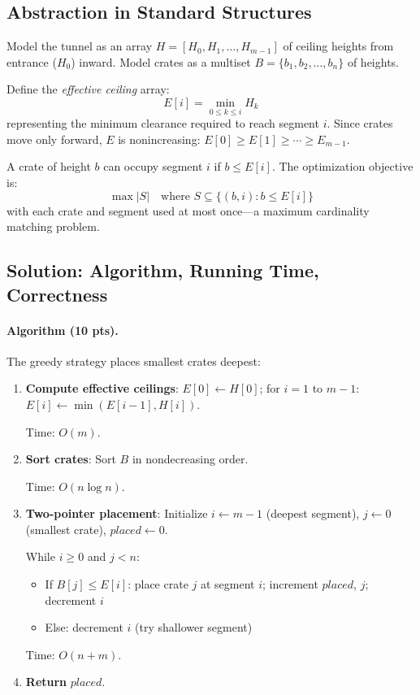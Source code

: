 \documentclass[sigconf]{acmart}
\begin{document}
\subsection{Abstraction in Standard Structures}
\label{subsec:abstraction-greedy}

Model the tunnel as an array $H = [H_0, H_1, \ldots, H_{m-1}]$ of ceiling heights from entrance ($H_0$) inward. Model crates as a multiset $B = \{b_1, b_2, \ldots, b_n\}$ of heights.

Define the \emph{effective ceiling} array:
\[
E[i] = \min_{0 \leq k \leq i} H_k
\]
representing the minimum clearance required to reach segment $i$. Since crates move only forward, $E$ is nonincreasing: $E[0] \geq E[1] \geq \cdots \geq E_{m-1}$.

A crate of height $b$ can occupy segment $i$ if $b \leq E[i]$. The optimization objective is:
\[
\max |S| \quad \text{where } S \subseteq \{(b, i) : b \leq E[i]\}
\]
with each crate and segment used at most once—a maximum cardinality matching problem.

\subsection{Solution: Algorithm, Running Time, Correctness}
\label{subsec:solution-greedy}

\paragraph{Algorithm (10 pts).}
The greedy strategy places smallest crates deepest:

\begin{enumerate}[leftmargin=*, itemsep=0.4em]
\item \textbf{Compute effective ceilings}: $E[0] \leftarrow H[0]$; for $i = 1$ to $m-1$: $E[i] \leftarrow \min(E[i-1], H[i])$. 
  
Time: $O(m)$.

\item \textbf{Sort crates}: Sort $B$ in nondecreasing order. 

Time: $O(n \log n)$.

\item \textbf{Two-pointer placement}: Initialize $i \leftarrow m-1$ (deepest segment), $j \leftarrow 0$ (smallest crate), $\textit{placed} \leftarrow 0$.

While $i \geq 0$ and $j < n$:
\begin{itemize}[itemsep=0.2em]
\item If $B[j] \leq E[i]$: place crate $j$ at segment $i$; increment $\textit{placed}$, $j$; decrement $i$
\item Else: decrement $i$ (try shallower segment)
\end{itemize}

Time: $O(n + m)$.

\item \textbf{Return} $\textit{placed}$.
\end{enumerate}
\end{document}
